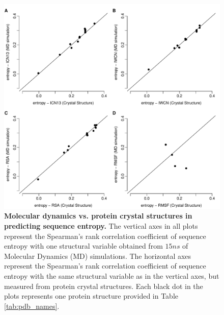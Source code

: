 \documentclass[12pt]{article}
\begin{document}
            \begin{figure}[t]
            \begin{center}
                \includegraphics[height=0.7\textheight]{cor_cr_md.pdf}
            \end{center}
            \caption{
                     {\bf Molecular dynamics vs. protein crystal structures in predicting sequence entropy.}
                     The vertical axes in all plots represent the Spearman's rank correlation coefficient of sequence entropy with one structural variable obtained from $15ns$ of Molecular Dynamics (MD) simulations. The horizontal axes represent the Spearman's rank correlation coefficient of sequence entropy with the same structural variable as in the vertical axes, but measured from protein crystal structures. Each black dot in the plots represents one protein structure provided in Table \ref{tab:pdb_names}. %
                     }
            \label{fig:cor_cr_md}
            \end{figure}
\end{document}
